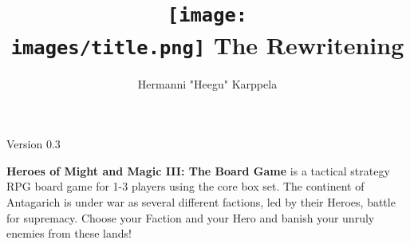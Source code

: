 \documentclass[12pt]{article}
\def\assets{assets}
\def\images{\assets/images}
\begin{document}
\title{\texttt{[image: \\images/title.png]} The Rewritening}

\author{Hermanni "Heegu" Karppela}
\maketitle

\begin{center}
Version 0.3
\end{center}

\tableofcontents

\clearpage

\textbf{Heroes of Might and Magic III: The Board Game} is a tactical strategy RPG board game for 1-3 players using the core box set.
The continent of Antagarich is under war as several different factions, led by their Heroes, battle for supremacy. Choose your Faction and your Hero and banish your unruly enemies from these lands!
\bigbreak






























\end{document}

